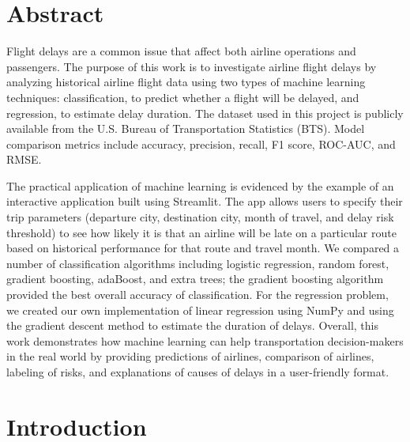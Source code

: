
\section{Abstract}

Flight delays are a common issue that affect both airline operations and passengers. The purpose of this work is to investigate airline flight delays by analyzing historical airline flight data using two types of machine learning techniques: classification, to predict whether a flight will be delayed, and regression, to estimate delay duration. The dataset used in this project is publicly available from the U.S. Bureau of Transportation Statistics (BTS). Model comparison metrics include accuracy, precision, recall, F1 score, ROC-AUC, and RMSE.

The practical application of machine learning is evidenced by the example of an interactive application built using Streamlit. The app allows users to specify their trip parameters (departure city, destination city, month of travel, and delay risk threshold) to see how likely it is that an airline will be late on a particular route based on historical performance for that route and travel month. We compared a number of classification algorithms including logistic regression, random forest, gradient boosting, adaBoost, and extra trees; the gradient boosting algorithm provided the best overall accuracy of classification. For the regression problem, we created our own implementation of linear regression using NumPy and using the gradient descent method to estimate the duration of delays. Overall, this work demonstrates how machine learning can help transportation decision-makers in the real world by providing predictions of airlines, comparison of airlines, labeling of risks, and explanations of causes of delays in a user-friendly format.


\section{Introduction}

